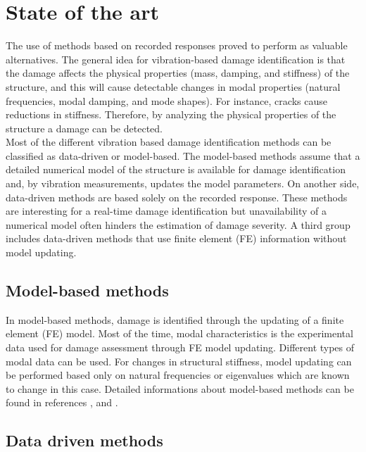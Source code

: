 \documentclass[journal]{IEEEtran}
\begin{document}
\section{State of the art}

The use of methods based on recorded responses proved to perform as valuable alternatives. 
The general idea for vibration-based damage identification is that the damage affects the physical properties (mass, damping, and stiffness) of the structure, and this will cause detectable changes in modal properties (natural frequencies, modal damping, and mode shapes). 
For instance, cracks cause reductions in stiffness. Therefore, by analyzing the physical properties of the structure a damage can be detected.
\\

Most of the different vibration based damage identification methods can be classified as data-driven or model-based.
 The model-based methods assume that a detailed numerical model of the structure is available for damage identification and, by vibration measurements, updates the model parameters.
 On another side, data-driven methods are based solely on the recorded response. These methods are interesting for a real-time damage identification but unavailability of a numerical model often hinders the estimation of damage severity.
 A third group includes data-driven methods that use finite element (FE) information without model updating.

\subsection{Model-based methods}  

In model-based methods, damage is identified through the updating of a finite element (FE) model.
 Most of the time, modal characteristics is the experimental data used for damage assessment through FE model updating.%
Different types of modal data can be used. For changes in structural stiffness, model updating can be performed based only on natural frequencies or eigenvalues which are known to change in this case.
 Detailed informations about model-based methods can be found in references 
\cite{fritzen1998damage},
\cite{simoen2015dealing} and
\cite{teughels2005damage}.


\subsection{Data driven methods}
\end{document}
